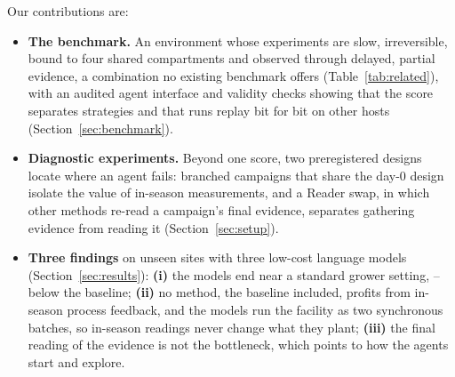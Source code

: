 Our contributions are:
\begin{itemize}[leftmargin=*,itemsep=1pt,topsep=2pt]
\item \textbf{The benchmark.} An environment whose experiments are slow, irreversible, bound to four shared compartments and observed through delayed, partial evidence, a combination no existing benchmark offers (Table~\ref{tab:related}), with an audited agent interface and validity checks showing that the score separates strategies and that runs replay bit for bit on other hosts (Section~\ref{sec:benchmark}).
\item \textbf{Diagnostic experiments.} Beyond one score, two preregistered designs locate where an agent fails: branched campaigns that share the day-0 design isolate the value of in-season measurements, and a Reader swap, in which other methods re-read a campaign's final evidence, separates gathering evidence from reading it (Section~\ref{sec:setup}).
\item \textbf{Three findings} on  unseen sites with three low-cost language models (Section~\ref{sec:results}): \textbf{(i)} the models end near a standard grower setting, --~\eur{} below the baseline; \textbf{(ii)} no method, the baseline included, profits from in-season process feedback, and the models run the facility as two synchronous batches, so in-season readings never change what they plant; \textbf{(iii)} the final reading of the evidence is not the bottleneck, which points to how the agents start and explore.
\end{itemize}
